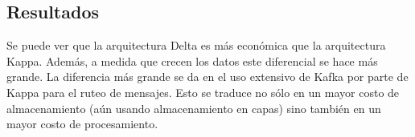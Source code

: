 \subsection{Resultados}

Se puede ver que la arquitectura Delta es más económica que la arquitectura Kappa.
Además, a medida que crecen los datos este diferencial se hace más grande.
La diferencia más grande se da en el uso extensivo de Kafka por parte de Kappa para el ruteo de mensajes. 
Esto se traduce no sólo en un mayor costo de almacenamiento (aún usando almacenamiento en capas) sino también en un mayor costo de procesamiento.
\newpage